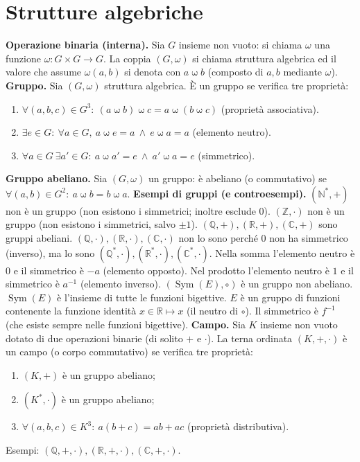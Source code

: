 \documentclass[11pt,a4paper]{article}
\newcommand{\pagina}[1]{\clearpage}
\begin{document}
\section*{Strutture algebriche}
\textbf{Operazione binaria (interna).} Sia $G$ insieme non vuoto: si chiama $\omega$ una funzione $\omega:G\times G\to G$. La coppia $(G,\omega)$ si chiama struttura algebrica ed il valore che assume $\omega(a,b)$ si denota con $a\mathbin\omega b$ (composto di $a,b$ mediante $\omega$).
\textbf{Gruppo.} Sia $(G,\omega)$ struttura algebrica. È un gruppo se verifica tre proprietà:
\begin{enumerate}
\item $\forall(a,b,c)\in G^3:\ (a\mathbin\omega b)\mathbin\omega c=a\mathbin\omega(b\mathbin\omega c)$ (proprietà associativa).
\item $\exists e\in G:\ \forall a\in G,\ a\mathbin\omega e=a\ \wedge\ e\mathbin\omega a=a$ (elemento neutro).
\item $\forall a\in G\ \exists a'\in G:\ a\mathbin\omega a'=e\ \wedge\ a'\mathbin\omega a=e$ (simmetrico).
\end{enumerate}
\textbf{Gruppo abeliano.} Sia $(G,\omega)$ un gruppo: è abeliano (o commutativo) se $\forall(a,b)\in G^2:\ a\mathbin\omega b=b\mathbin\omega a$.
\textbf{Esempi di gruppi (e controesempi).} $(\mathbb N^*,+)$ non è un gruppo (non esistono i simmetrici; inoltre esclude $0$). $(\mathbb Z,\cdot)$ non è un gruppo (non esistono i simmetrici, salvo $\pm1$).
\pagina{29}
$(\mathbb Q,+),(\mathbb R,+),(\mathbb C,+)$ sono gruppi abeliani. $(\mathbb Q,\cdot),(\mathbb R,\cdot),(\mathbb C,\cdot)$ non lo sono perché $0$ non ha simmetrico (inverso), ma lo sono $(\mathbb Q^*,\cdot),(\mathbb R^*,\cdot),(\mathbb C^*,\cdot)$.
Nella somma l'elemento neutro è $0$ e il simmetrico è $-a$ (elemento opposto). Nel prodotto l'elemento neutro è $1$ e il simmetrico è $a^{-1}$ (elemento inverso).
$(\operatorname{Sym}(E),\circ)$ è un gruppo non abeliano. $\operatorname{Sym}(E)$ è l'insieme di tutte le funzioni bigettive. $E$ è un gruppo di funzioni contenente la funzione identità $x\in\mathbb R\mapsto x$ (il neutro di $\circ$). Il simmetrico è $f^{-1}$ (che esiste sempre nelle funzioni bigettive).
\textbf{Campo.} Sia $K$ insieme non vuoto dotato di due operazioni binarie (di solito $+$ e $\cdot$). La terna ordinata $(K,+,\cdot)$ è un campo (o corpo commutativo) se verifica tre proprietà:
\begin{enumerate}\item $(K,+)$ è un gruppo abeliano;\item $(K^*,\cdot)$ è un gruppo abeliano;\item $\forall(a,b,c)\in K^3:\ a(b+c)=ab+ac$ (proprietà distributiva).\end{enumerate}
Esempi: $(\mathbb Q,+,\cdot),(\mathbb R,+,\cdot),(\mathbb C,+,\cdot)$.
\pagina{30}
\end{document}
